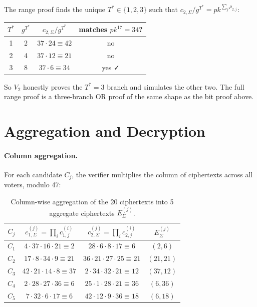 \documentclass[12pt,a4paper,oneside]{report}
\begin{document}
The range proof finds the unique $T^* \in \{1, 2, 3\}$ such that 
$c_{2, \Sigma} / g^{T^*} = pk^{\sum_j \rho_{2, j}}$:

\begin{table}[H]
\centering
\small
\begin{tabular}{cccc}
\toprule
$T^*$ & $g^{T^*}$ & $c_{2, \Sigma} / g^{T^*}$ & matches $pk^{17} = 34$? \\
\midrule
1 & 2 & $37 \cdot 24 \equiv 42$ & no \\
2 & 4 & $37 \cdot 12 \equiv 21$ & no \\
3 & 8 & $37 \cdot 6 \equiv 34$ & yes ✓ \\
\bottomrule
\end{tabular}
\end{table}

So $V_2$ honestly proves the $T^* = 3$ branch and simulates the other 
two. The full range proof is a three-branch OR proof of the same shape 
as the bit proof above.

\section{Aggregation and Decryption}
\label{sec:byhand-aggregation}

\paragraph{Column aggregation.} For each candidate $C_j$, the verifier 
multiplies the column of ciphertexts across all voters, modulo 47:

\begin{table}[H]
\centering
\caption{Column-wise aggregation of the 20 ciphertexts into 5 aggregate 
ciphertexts $E_\Sigma^{(j)}$.}
\label{tab:byhand-aggregation}
\small
\begin{tabular}{cccc}
\toprule
$C_j$ & $c_{1, \Sigma}^{(j)} = \prod_i c_{1, j}^{(i)}$ & 
$c_{2, \Sigma}^{(j)} = \prod_i c_{2, j}^{(i)}$ & $E_\Sigma^{(j)}$ \\
\midrule
$C_1$ & $4 \cdot 37 \cdot 16 \cdot 21 \equiv 2$ & $28 \cdot 6 \cdot 8 \cdot 17 \equiv 6$ & $(2, 6)$ \\
$C_2$ & $17 \cdot 8 \cdot 34 \cdot 9 \equiv 21$ & $36 \cdot 21 \cdot 27 \cdot 25 \equiv 21$ & $(21, 21)$ \\
$C_3$ & $42 \cdot 21 \cdot 14 \cdot 8 \equiv 37$ & $2 \cdot 34 \cdot 32 \cdot 21 \equiv 12$ & $(37, 12)$ \\
$C_4$ & $2 \cdot 28 \cdot 27 \cdot 36 \equiv 6$  & $25 \cdot 1 \cdot 28 \cdot 21 \equiv 36$ & $(6, 36)$ \\
$C_5$ & $7 \cdot 32 \cdot 6 \cdot 17 \equiv 6$   & $42 \cdot 12 \cdot 9 \cdot 36 \equiv 18$ & $(6, 18)$ \\
\bottomrule
\end{tabular}
\end{table}
\end{document}
